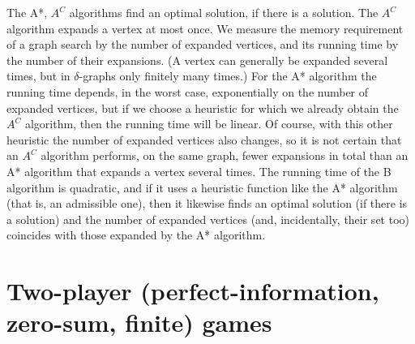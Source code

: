 \documentclass[margin=0px]{article}
\begin{document}
The A*, $A^C$ algorithms find an optimal solution, if there is a solution. The $A^C$ algorithm expands a vertex at most once.
We measure the memory requirement of a graph search by the number of expanded vertices, and its running time by the number of their expansions. (A vertex can generally be expanded several times, but in $\delta$-graphs only finitely many times.) For the A* algorithm the running time depends, in the worst case, exponentially on the number of expanded vertices, but if we choose a heuristic for which we already obtain the $A^C$ algorithm, then the running time will be linear. Of course, with this other heuristic the number of expanded vertices also changes, so it is not certain that an $A^C$ algorithm performs, on the same graph, fewer expansions in total than an A* algorithm that expands a vertex several times. The running time of the B algorithm is quadratic, and if it uses a heuristic function like the A* algorithm (that is, an admissible one), then it likewise finds an optimal solution (if there is a solution) and the number of expanded vertices (and, incidentally, their set too) coincides with those expanded by the A* algorithm.

\section{Two-player (perfect-information, zero-sum, finite) games}
\end{document}
